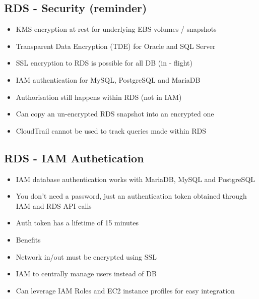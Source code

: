 \subsection{RDS - Security (reminder)}
\begin{itemize}
    \item KMS encryption at rest for underlying EBS volumes / snapshots
    \item Transparent Data Encryption (TDE) for Oracle and SQL Server
    \item SSL encryption to RDS is possible for all DB (in - flight)
    \item IAM authentication for MySQL, PostgreSQL and MariaDB
    \item Authorisation still happens within RDS (not in IAM)
    \item Can copy an un-encrypted RDS snapshot into an encrypted one
    \item CloudTrail cannot be used to track queries made within RDS
\end{itemize}

\subsection{RDS - IAM Authetication}
\begin{itemize}
    \item IAM database authentication works with MariaDB, MySQL and PostgreSQL
    \item You don't need a password, just an authentication token obtained through IAM and RDS API calls
    \item Auth token has a lifetime of 15 minutes
    \item Benefits
    \item Network in/out must be encrypted using SSL
    \item IAM to centrally manage users instead of DB
    \item Can leverage IAM Roles and EC2 instance profiles for easy integration
\end{itemize}

